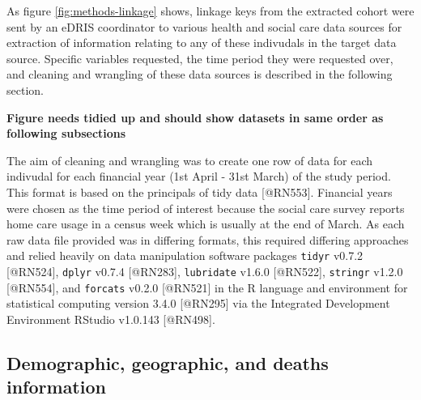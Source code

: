 \documentclass[]{article}
\begin{document}
As figure \ref{fig:methods-linkage} shows, linkage keys from the
extracted cohort were sent by an eDRIS coordinator to various health and
social care data sources for extraction of information relating to any
of these indivudals in the target data source. Specific variables
requested, the time period they were requested over, and cleaning and
wrangling of these data sources is described in the following section.

\textbf{Figure needs tidied up and should show datasets in same order as
following subsections}

The aim of cleaning and wrangling was to create one row of data for each
indivudal for each financial year (1st April - 31st March) of the study
period. This format is based on the principals of tidy data
{[}@RN553{]}. Financial years were chosen as the time period of interest
because the social care survey reports home care usage in a census week
which is usually at the end of March. As each raw data file provided was
in differing formats, this required differing approaches and relied
heavily on data manipulation software packages \texttt{tidyr} v0.7.2
{[}@RN524{]}, \texttt{dplyr} v0.7.4 {[}@RN283{]}, \texttt{lubridate}
v1.6.0 {[}@RN522{]}, \texttt{stringr} v1.2.0 {[}@RN554{]}, and
\texttt{forcats} v0.2.0 {[}@RN521{]} in the R language and environment
for statistical computing version 3.4.0 {[}@RN295{]} via the Integrated
Development Environment RStudio v1.0.143 {[}@RN498{]}.

\FloatBarrier

\subsection{Demographic, geographic, and deaths information}\label{subsubsec:nrs-summs}

\begin{table}[h]
\centering
\caption{Demographic file data}
\label{tab:demos}
\end{table}
\end{document}
